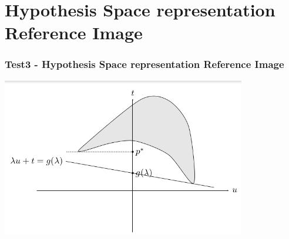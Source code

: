 \documentclass{beamer}
\begin{document}

\section{Hypothesis Space representation Reference Image}
\begin{frame}
\frametitle{\textbf{Test3 - Hypothesis Space representation Reference Image}}
\centering
\begin{minipage}{1\textwidth}
    \centering
    \includegraphics[width=0.8\textwidth]{images/reference_image.png} %
\end{minipage}
\end{frame}

\end{document}
